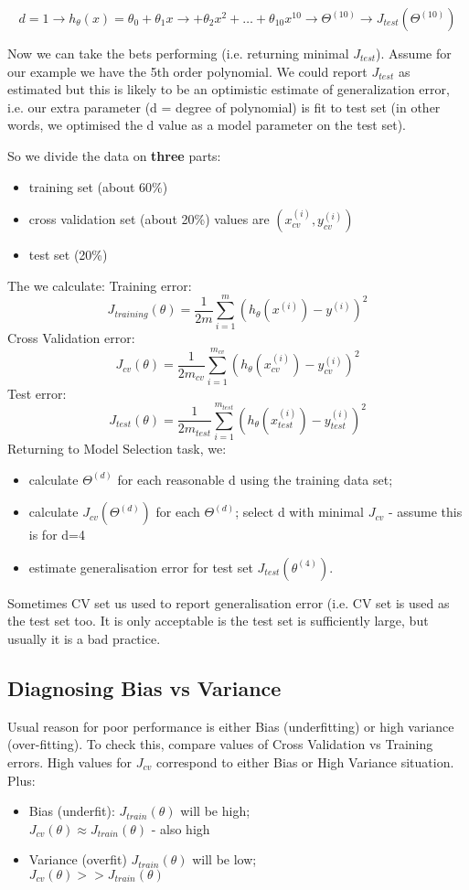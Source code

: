 \documentclass{scrartcl}
\begin{document}
\[ d = 1 \rightarrow h_\theta(x) = \theta_0 + \theta_1x \rightarrow +
\theta_2x^2 + \dots + \theta_{10}x^{10} \rightarrow \Theta^{(10)}
\rightarrow J_{test}(\Theta^{(10)}) \]

Now we can take the bets performing (i.e. returning minimal
$J_{test}$). Assume for our example we have the 5th order polynomial.
We could report $J_{test}$ as estimated but this is likely to be an
optimistic estimate of generalization error, i.e. our extra parameter
(d = degree of polynomial) is fit to test set (in other words, we
optimised the d value as a model parameter on the test set).

So we divide the data on {\bf three} parts:
\begin{itemize}
\item training set (about 60\%)
\item cross validation set (about 20\%) values are
  $(x_{cv}^{(i)},y_{cv}^{(i)})$
\item test set (20\%)
\end{itemize}
The we calculate: Training error:
\[ J_{training}(\theta) = \frac{1}{2m} \sum
\limits_{i=1}^{m}(h_\theta(x^{(i)}) - y^{(i)})^2 \] Cross Validation
error:
\[ J_{cv}(\theta) = \frac{1}{2m_{cv}} \sum
\limits_{i=1}^{m_{cv}}(h_\theta(x_{cv}^{(i)}) - y_{cv}^{(i)})^2 \]
Test error:
\[ J_{test}(\theta) = \frac{1}{2m_{test}} \sum
\limits_{i=1}^{m_{test}}(h_\theta(x_{test}^{(i)}) -
y_{test}^{(i)})^2 \] Returning to Model Selection task, we:
\begin{itemize}
\item calculate $\Theta^{(d)}$ for each reasonable d using the
  training data set;
\item calculate $J_{cv}(\Theta^{(d)})$ for each $\Theta^{(d)}$; select
  d with minimal $J_{cv}$ - assume this is for d=4
\item estimate generalisation error for test set
  $J_{test}(\theta^{(4)})$.
\end{itemize}
Sometimes CV set us used to report generalisation error (i.e. CV set
is used as the test set too. It is only acceptable is the test set is
sufficiently large, but usually it is a bad practice.

\subsection{Diagnosing Bias vs Variance}
\label{sec:10-4}

Usual reason for poor performance is either Bias (underfitting) or
high variance (over-fitting). To check this, compare values of Cross
Validation vs Training errors.
High values for $J_{cv}$ correspond to either Bias or High Variance
situation. Plus:
\begin{itemize}
\item Bias (underfit):
  $J_{train}(\theta)$ will be high; \\
  $J_{cv}(\theta) \approx J_{train}(\theta) $ - also high
\item Variance (overfit)
  $J_{train}(\theta)$ will be low; \\
  $J_{cv}(\theta) >> J_{train}(\theta) $
\end{itemize}
\end{document}
